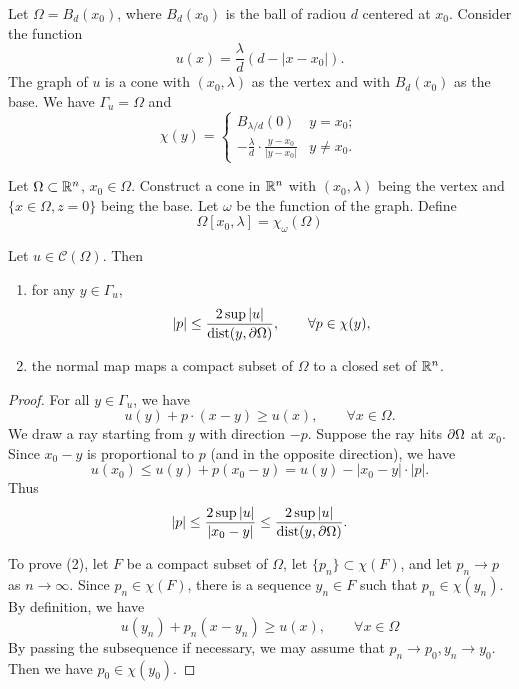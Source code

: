\begin{example} Let $\Omega=B_d(x_0)$, where $B_d(x_0)$ is the ball of radiou $d$ centered at $x_0$. Consider the function
\[
u(x)=\frac{\lambda}{d}(d-|x-x_0|).
\]
The graph of $u$ is a cone with $(x_0,\lambda)$ as the vertex and with $B_d(x_0)$ as the base. We have $\Gamma_u=\Omega$ and 
\[
\chi(y)=\left\{
\begin{array}{ll}
B_{\lambda/d}(0) & y=x_0;\\
-\frac{\lambda}{d}\cdot\frac{y-x_0}{|y-x_0|} &y\neq x_0.
\end{array}
\right.
\]
\end{example}

\begin{definition} Let $\Omega\subset \mathbb R^n$, $x_0\in\Omega$. Construct a cone in $\mathbb R^n$ with $(x_0,\lambda)$ being the vertex and $\{x\in\Omega, z=0\}$ being the base. Let $\omega$ be the function of the graph. Define
\[
\Omega[x_0,\lambda]=\chi_\omega(\Omega)
\]
\end{definition}



\begin{lemma}\label{15} Let $u\in \mathcal C(\Omega)$. Then
\begin{enumerate} 
\item for any $y\in\Gamma_u$,
\[
|p|\leq\frac{2\sup|u|}{{\rm dist}(y,\partial\Omega)},\qquad \forall p\in\chi(y),
\]
\item the normal map maps a compact subset of $\Omega$ to a closed set of $\mathbb R^n$.
\end{enumerate}
\end{lemma}


\begin{proof}
For all $y\in\Gamma_u$, we have
\[
u(y)+p\cdot(x-y)\geq u(x),\qquad \forall x\in\Omega.
\]
We draw a ray starting from $y$ with direction $-p$. Suppose the ray hits $\partial\Omega$ at $x_0$. 
Since $x_0-y$ is proportional to $p$ (and in the opposite direction), we have
\[
u(x_0)\leq u(y)+p(x_0-y)=u(y)-|x_0-y|\cdot|p|.
\]
Thus
\[
|p|\leq\frac{2\sup|u|}{|x_0-y|}\leq\frac{2\sup|u|}{{\rm dist}(y,\partial\Omega)}.
\]

To prove (2), let $F$ be  a compact subset of $\Omega$, let  $\{p_n\}\subset\chi(F)$, and let $p_n\to p$ as $n\to\infty$. Since $p_n\in\chi(F)$, there is a sequence $y_n\in F$ such that $p_n\in\chi(y_n)$. By definition, we have
\[
u(y_n)+p_n(x-y_n)\geq u(x),\qquad\forall x\in\Omega
\]
By passing the subsequence if necessary, we may assume that $p_n\to p_0, y_n\to y_0$. 
Then we have $p_0\in\chi(y_0)$.

\end{proof}

